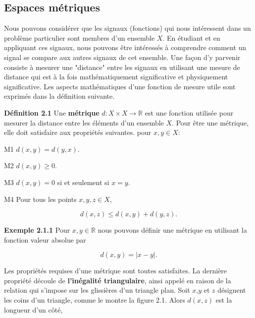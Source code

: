 \documentclass[11pt,twoside,a4paper]{article}
\begin{document}

\subsection{Espaces métriques}

Nous pouvons considérer que les signaux (fonctions) qui nous intéressent dans un problème particulier sont membres d'un ensemble $X$. En étudiant et en appliquant ces signaux, nous pouvons être intéressés à comprendre 
comment un signal se compare aux autres signaux de cet ensemble. Une façon d'y parvenir consiste à mesurer une "distance" entre les signaux en utilisant une mesure de distance qui est à la fois mathématiquement significative 
et physiquement significative. Les aspects mathématiques d'une fonction de mesure utile sont exprimés dans la définition suivante.

\vspace{5mm}

\textbf{Définition 2.1} Une \textbf{métrique} $d: X \times X \longrightarrow \mathbb{R}$ est une fonction utilisée pour mesurer la distance entre les éléments d'un ensemble $X$. 
Pour être une métrique, elle doit satisfaire aux propriétés suivantes. pour $x, y \in \textit{X}$:
\vspace{2mm}

M1 $d(x, y) = d(y, x)$.

M2 $d(x, y) \geq 0$.

M3 $d(x, y) = 0$ si et seulement si $x = y$.

M4 Pour tous les points $x, y, z \in \textit{X}$,

\begin{equation}
       d(x, z) \leq d(x, y) + d(y, z).
\end{equation}

\vspace{10mm}

\textbf{Exemple 2.1.1} Pour $x, y \in \mathbb{R}$ nous pouvons définir une métrique en utilisant la fonction valeur absolue par

\begin{equation*}
       d(x, y) = |x - y|.
\end{equation*}

Les propriétés requises d'une métrique sont toutes satisfaites. La dernière propriété découle de \textbf{l'inégalité triangulaire}, 
ainsi appelé en raison de la relation qui s'impose sur les glissières d'un triangle plan. Soit $x$,$y$ et $z$ désignent les coins d'un triangle, 
comme le montre la figure 2.1. Alors $d(x, z)$ est la longueur d'un côté,
\end{document}
